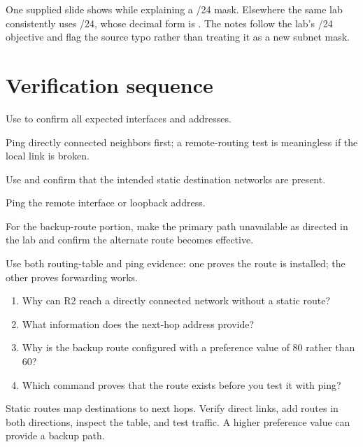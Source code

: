 \begin{pitfall}
One supplied slide shows  while explaining a /24 mask. Elsewhere the same lab consistently uses /24, whose decimal form is . The notes follow the lab's /24 objective and flag the source typo rather than treating it as a new subnet mask.
\end{pitfall}

\section{Verification sequence}
\begin{netsteps}
\item Use  to confirm all expected interfaces and addresses.
\item Ping directly connected neighbors first; a remote-routing test is meaningless if the local link is broken.
\item Use  and confirm that the intended static destination networks are present.
\item Ping the remote interface or loopback address.
\item For the backup-route portion, make the primary path unavailable as directed in the lab and confirm the alternate route becomes effective.
\end{netsteps}

\begin{verification}
Use both routing-table and ping evidence: one proves the route is installed; the other proves forwarding works.
\end{verification}

\begin{quickcheck}
\begin{enumerate}
\item Why can R2 reach a directly connected network without a static route?
\item What information does the next-hop address provide?
\item Why is the backup route configured with a preference value of 80 rather than 60?
\item Which command proves that the route exists before you test it with ping?
\end{enumerate}
\end{quickcheck}

\begin{chapterrecap}
Static routes map destinations to next hops. Verify direct links, add routes in both directions, inspect the table, and test traffic. A higher preference value can provide a backup path.
\end{chapterrecap}


